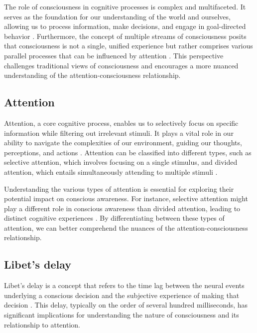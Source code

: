 \documentclass[10pt]{article}
\begin{document}
\begin{sloppypar}
  The role of consciousness in cognitive processes is complex and multifaceted. It serves as the foundation for our understanding of the world and ourselves, allowing us to process information, make decisions, and engage in goal-directed behavior \citep{dijksterhuis_goals_2010}. Furthermore, the concept of multiple streams of consciousness posits that consciousness is not a single, unified experience but rather comprises various parallel processes that can be influenced by attention \citep{montemayor_types_2021}. This perspective challenges traditional views of consciousness and encourages a more nuanced understanding of the attention-consciousness relationship.

  \subsection{Attention}
  \label{sec:attention}

  Attention, a core cognitive process, enables us to selectively focus on specific information while filtering out irrelevant stimuli. It plays a vital role in our ability to navigate the complexities of our environment, guiding our thoughts, perceptions, and actions \citep{cohen_attentional_2012}. Attention can be classified into different types, such as selective attention, which involves focusing on a single stimulus, and divided attention, which entails simultaneously attending to multiple stimuli \citep{koivisto_relationship_2009}.

  Understanding the various types of attention is essential for exploring their potential impact on conscious awareness. For instance, selective attention might play a different role in conscious awareness than divided attention, leading to distinct cognitive experiences \citep{kentridge_attended_2008}. By differentiating between these types of attention, we can better comprehend the nuances of the attention-consciousness relationship.

  \subsection{Libet’s delay}
  \label{sec:libet}

  Libet’s delay is a concept that refers to the time lag between the neural events underlying a conscious decision and the subjective experience of making that decision \citep{libet_time_1983}. This delay, typically on the order of several hundred milliseconds, has significant implications for understanding the nature of consciousness and its relationship to attention.


\end{sloppypar}
\end{document}
